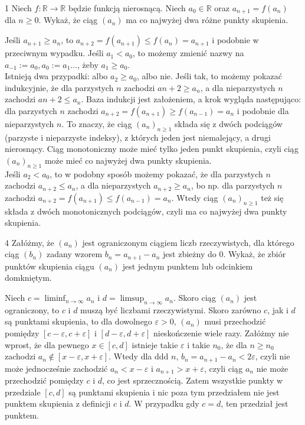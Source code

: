 \documentclass{../note}
\begin{document}
\begin{zadanie}{1}
Niech $f:\mathbb{R}\rightarrow\mathbb{R}$ będzie funkcją nierosnącą. Niech $a_{0}\in\mathbb{R}$ oraz $a_{n+1}=f(a_{n})$ dla $n\ge0$. Wykaż, że ciąg $(a_{n})$ ma co najwyżej dwa różne punkty skupienia.
\end{zadanie}
\begin{rozwiazanie}
Jeśli $a_{n+1} \geq a_n$, to $a_{n+2} = f(a_{n+1}) \leq f(a_n) = a_{n+1}$ i podobnie w przeciwnym wypadku. Jeśli $a_1 < a_0$, to możemy zmienić nazwy na $a_{-1} := a_0, a_0 := a_1 \ldots$, żeby $a_1 \geq a_0$.\\
Istnieją dwa przypadki: albo $a_2 \geq a_0$, albo nie. Jeśli tak, to możemy pokazać indukcyjnie, że dla parzystych $n$ zachodzi $a{n+2} \geq a_n$, a dla nieparzystych $n$ zachodzi $a{n+2} \leq a_n$. Baza indukcji jest założeniem, a krok wygląda następująco: dla parzystych $n$ zachodzi $a_{n+2} = f(a_{n+1}) \geq f(a_{n-1}) = a_n$ i podobnie dla nieparzystych $n$. To znaczy, że ciąg $(a_n)_{n\geq1}$ składa się z dwóch podciągów (parzyste i nieparzyste indeksy), z których jeden jest niemalejący, a drugi nierosnący. Ciąg monotoniczny może mieć tylko jeden punkt skupienia, czyli ciąg $(a_n)_{n\geq1}$ może mieć co najwyżej dwa punkty skupienia.\\
Jeśli $a_2 < a_0$, to w podobny sposób możemy pokazać, że dla parzystych $n$ zachodzi $a_{n+2} \leq a_n$, a dla nieparzystych $a_{n+2} \geq a_n$, bo np. dla parzystych $n$ zachodzi $a_{n+2} = f(a_{n+1}) \leq f(a_{n-1}) = a_n$. Wtedy ciąg $(a_n)_{n\geq1}$ też się składa z dwóch monotonicznych podciągów, czyli ma co najwyżej dwa punkty skupienia.
\end{rozwiazanie}

\begin{zadanie}{4}
Załóżmy, że $(a_{n})$ jest ograniczonym ciągiem liczb rzeczywistych, dla którego ciąg $(b_{n})$ zadany wzorem $b_{n}=a_{n+1}-a_{n}$ jest zbieżny do 0. Wykaż, że zbiór punktów skupienia ciągu $(a_{n})$ jest jednym punktem lub odcinkiem domkniętym.
\end{zadanie}
\begin{rozwiazanie}
Niech $c = \liminf_{n\to\infty} a_n$ i $d = \limsup_{n\to\infty} a_n$. Skoro ciąg $(a_n)$ jest ograniczony, to $c$ i $d$ muszą być liczbami rzeczywistymi. Skoro zarówno $c$, jak i $d$ są punktami skupienia, to dla dowolnego $\varepsilon > 0$, $(a_n)$ musi przechodzić pomiędzy $[c-\varepsilon, c+\varepsilon]$ i $[d-\varepsilon, d+\varepsilon]$ nieskończenie wiele razy. Załóżmy nie wprost, że dla pewnego $x \in [c, d]$ istnieje takie $\varepsilon$ i takie $n_0$, że dla $n \geq n_0$ zachodzi $a_n \notin [x-\varepsilon, x+\varepsilon]$. Wtedy dla ddd $n$, $b_n = a_{n+1} - a_n < 2\varepsilon$, czyli nie może jednocześnie zachodzić $a_n < x-\varepsilon$ i $a_{n+1} > x+\varepsilon$, czyli ciąg $a_n$ nie może przechodzić pomiędzy $c$ i $d$, co jest sprzecznością. Zatem wszystkie punkty w przedziale $[c, d]$ są punktami skupienia i nic poza tym przedziałem nie jest punktem skupienia z definicji $c$ i $d$. W przypadku gdy $c = d$, ten przedział jest punktem.
\end{rozwiazanie}
\end{document}
